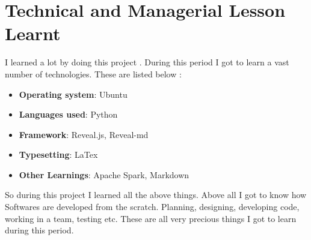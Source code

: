 
\section{Technical and Managerial Lesson Learnt}
I learned a lot by doing this project . During this period I got to learn a vast 
number of technologies. These are listed below :
\begin{itemize}
\item {\bf{Operating system}}: Ubuntu
\item {\bf{Languages used}}: Python
\item {\bf{Framework}}: Reveal.js, Reveal-md
\item {\bf{Typesetting}}: LaTex
\item {\bf{Other Learnings}}: Apache Spark, Markdown

\end{itemize}

So during this project I learned all the above things. Above all I got to know 
how Softwares are developed from the scratch. Planning, designing, developing code, 
working in a team, testing etc. These are all very precious things I got to learn 
during this period.  


